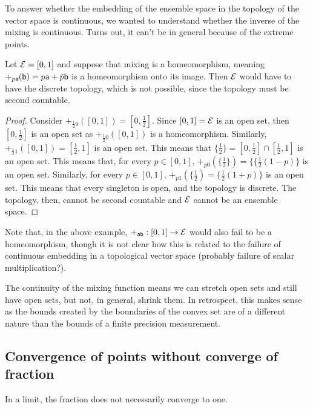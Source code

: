 To answer whether the embedding of the ensemble space in the topology of the vector space is continuous, we wanted to understand whether the inverse of the mixing is continuous. Turns out, it can't be in general because of the extreme points.

\begin{prop}
	Let $\Ens = [0,1]$ and suppose that mixing is a homeomorphism, meaning $+_{p \ens[a]}(\ens[b]) = p\ens[a] + \bar{p}\ens[b]$ is a homeomorphism onto its image. Then $\Ens$ would have to have the discrete topology, which is not possible, since the topology must be second countable.
\end{prop}

\begin{proof}
	Consider $+_{\frac{1}{2}0}([0,1])= [0,\frac{1}{2}]$. Since $[0,1] = \Ens$ is an open set, then $[0,\frac{1}{2}]$ is an open set as $+_{\frac{1}{2}0}([0,1])$ is a homeomorphism. Similarly, $+_{\frac{1}{2}1}([0,1])= [\frac{1}{2},1]$ is an open set. This means that $\{\frac{1}{2}\} = [0,\frac{1}{2}] \cap [\frac{1}{2},1]$ is an open set. This means that, for every $p \in [0,1]$, $+_{p0}(\{\frac{1}{2}\})= \{\{\frac{1}{2}(1-p)\}$ is an open set. Similarly, for every $p \in [0,1]$, $+_{p1}(\{\frac{1}{2})= \{\frac{1}{2}(1+p)\}$ is an open set. This means that every singleton is open, and the topology is discrete. The topology, then, cannot be second countable and $\Ens$ cannot be an ensemble space.
\end{proof}

Note that, in the above example, $+_{\ens[a]\ens[b]} : [0,1] \to \Ens$ would also fail to be a homeomorphism, though it is not clear how this is related to the failure of continuous embedding in a topological vector space (probably failure of scalar multiplication?).

The continuity of the mixing function means we can stretch open sets and still have open sets, but not, in general, shrink them. In retrospect, this makes sense as the bounds created by the boundaries of the convex set are of a different nature than the bounds of a finite precision measurement.

\subsection{Convergence of points without converge of fraction}

\begin{insight}
	In a limit, the fraction does not necessarily converge to one.
\end{insight}

